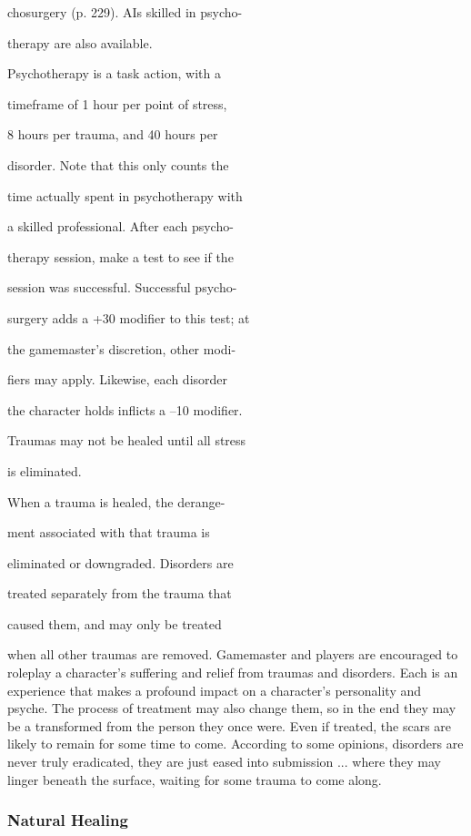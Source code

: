 chosurgery (p. 229). AIs skilled in psycho-

therapy are also available.

Psychotherapy is a task action, with a 

timeframe of 1 hour per point of stress, 

8 hours per trauma, and 40 hours per 

disorder. Note that this only counts the 

time actually spent in psychotherapy with 

a skilled professional. After each psycho-

therapy session, make a test to see if the 

session was successful. Successful psycho-

surgery adds a +30 modifier to this test; at 

the gamemaster's discretion, other modi-

fiers may apply. Likewise, each disorder 

the character holds inflicts a –10 modifier. 

Traumas may not be healed until all stress 

is eliminated.

When a trauma is healed, the derange-

ment associated with that trauma is 

eliminated or downgraded. Disorders are 

treated separately from the trauma that 

caused them, and may only be treated 

when all other traumas are removed.
Gamemaster and players are encouraged to roleplay 
a character's suffering and relief from traumas and 
disorders. Each is an experience that makes a profound 
impact on a character's personality and psyche. The 
process of treatment may also change them, so in the 
end they may be a transformed from the person they 
once were. Even if treated, the scars are likely to remain 
for some time to come. According to some opinions, 
disorders are never truly eradicated, they are just eased 
into submission ... where they may linger beneath the 
surface, waiting for some trauma to come along.

\subsubsection{Natural Healing}

